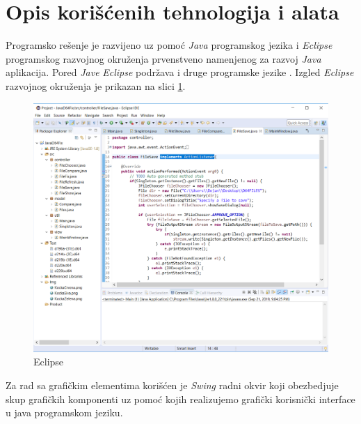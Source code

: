 \section{Opis korišćenih tehnologija i alata}

Programsko rešenje je razvijeno uz pomoć \textit{Java} programskog jezika i  \textit{Eclipse} programskog razvojnog okruženja prvenstveno namenjenog za razvoj \textit{Java} aplikacija. Pored \textit{Jave} \textit{Eclipse} podržava i druge programske jezike \cite{Eclipse}. Izgled \textit{Eclipse} razvojnog okruženja je prikazan na slici \ref{img:eclipse}.

\begin{figure}[ht]
\begin{center}
\includegraphics[width=\textwidth]{img/EclipseIDE.png}
\caption{Eclipse}
\label{img:eclipse}
\end{center}
\end{figure}

Za rad sa grafičkim elementima korišćen je \textit{Swing} radni okvir koji obezbedjuje skup grafičkih komponenti uz pomoć kojih realizujemo grafički korisnički interface u java programskom jeziku.